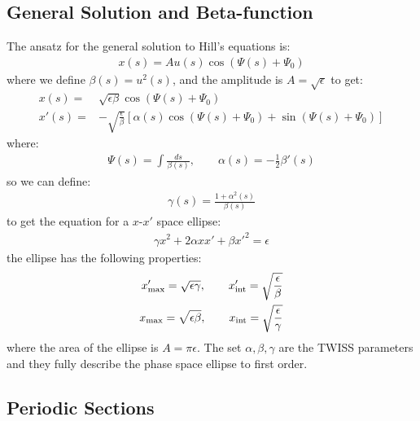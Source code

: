 \documentclass{article}
\numberwithin{equation}{section}
\begin{document}
\subsection{ General Solution and Beta-function }
The ansatz for the general solution to Hill's equations is:
\begin{align}
x(s) = A u(s) \cos(\Psi(s)+\Psi_0)
\end{align}
where we define $\beta(s) = u^2(s)$, and the amplitude is $A = \sqrt{\epsilon}$ to get:
\begin{align}
x(s) =& \sqrt{\epsilon \beta} \cos(\Psi(s)+\Psi_0) \\
x'(s) =& -\sqrt{\frac{\epsilon}{\beta}} \left[ \alpha(s) \cos(\Psi(s)+\Psi_0) + \sin(\Psi(s)+\Psi_0 )\right]
\end{align}
where:
\begin{align}
\Psi(s) = \int \frac{ds}{\beta(s)} , \qquad \alpha(s) = -\frac{1}{2}\beta'(s)
\end{align}
so we can define:
\begin{align}
\gamma(s) = \frac{1+\alpha^2(s)}{\beta(s)}
\end{align}
to get the equation for a $x$-$x'$ space ellipse:
\begin{align}
\gamma x^2 + 2 \alpha x x' + \beta x'^2 = \epsilon
\end{align}
the ellipse has the following properties:
\begin{align}
x'_{\rm max} = \sqrt{\epsilon \gamma} ,\qquad x'_{\rm int} = \sqrt{\frac{\epsilon}{\beta}} \\
x_{\rm max} = \sqrt{\epsilon \beta} ,\qquad x_{\rm int} = \sqrt{\frac{\epsilon}{\gamma}}
\end{align}
where the area of the ellipse is $A = \pi \epsilon$. The set $\alpha, \beta, \gamma$ are the TWISS parameters and they fully describe the phase space ellipse to first order.

\subsection{ Periodic Sections }
\end{document}
